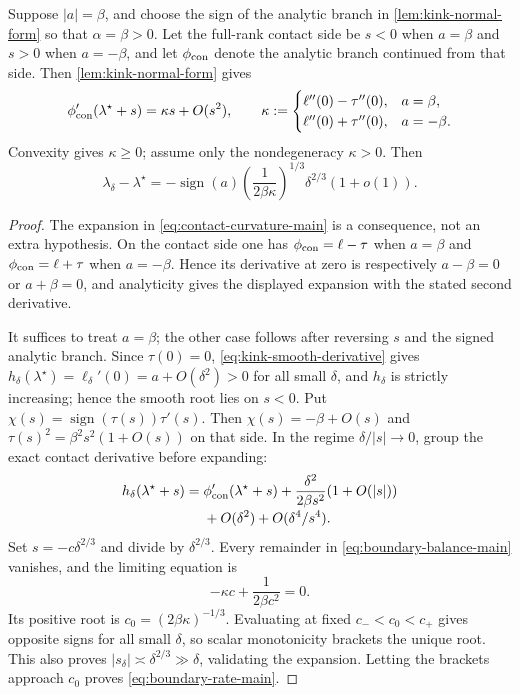 \begin{theorem}
\label{thm:rate-boundary}
Suppose \(|a|=\beta\), and choose the sign of the analytic branch in
\cref{lem:kink-normal-form} so that \(\alpha=\beta>0\).  Let the full-rank
contact side be \(s<0\) when \(a=\beta\) and \(s>0\) when \(a=-\beta\), and
let \(\phi_{\rm con}\) denote the analytic branch continued from that side.
Then \cref{lem:kink-normal-form} gives
\begin{equation}
 \phi'_{\rm con}(\lambda^\star+s)=\kappa s+O(s^2),
 \qquad
 \kappa:=
 \begin{cases}
  \ell''(0)-\tau''(0),&a=\beta,\\
  \ell''(0)+\tau''(0),&a=-\beta.
 \end{cases}
 \label{eq:contact-curvature-main}
\end{equation}
Convexity gives \(\kappa\ge0\); assume only the nondegeneracy
\(\kappa>0\).  Then
\begin{equation}
 \lambda_\delta-\lambda^\star
 =-\operatorname{sign}(a)
 \left(\frac{1}{2\beta\kappa}\right)^{1/3}
 \delta^{2/3}(1+o(1)).
 \label{eq:boundary-rate-main}
\end{equation}
\end{theorem}

\begin{proof}
The expansion in \eqref{eq:contact-curvature-main} is a consequence, not an
extra hypothesis.  On the contact side one has
\(\phi_{\rm con}=\ell-\tau\) when \(a=\beta\) and
\(\phi_{\rm con}=\ell+\tau\) when \(a=-\beta\).  Hence its derivative at
zero is respectively \(a-\beta=0\) or \(a+\beta=0\), and analyticity gives
the displayed expansion with the stated second derivative.

It suffices to treat \(a=\beta\); the other case follows after reversing
\(s\) and the signed analytic branch.  Since
\(\tau(0)=0\), \eqref{eq:kink-smooth-derivative} gives
\(h_\delta(\lambda^\star)=\ell_\delta'(0)=a+O(\delta^2)>0\) for all small
\(\delta\), and \(h_\delta\) is strictly increasing; hence the smooth root
lies on \(s<0\).
Put \(\chi(s)=\operatorname{sign}(\tau(s))\tau'(s)\).  Then
\(\chi(s)=-\beta+O(s)\) and
\(\tau(s)^2=\beta^2s^2(1+O(s))\) on that side.  In the regime
\(\delta/|s|\to0\), group the exact contact derivative before expanding:
\begin{align}
 h_\delta(\lambda^\star+s)
 ={}&\phi'_{\rm con}(\lambda^\star+s)
 +\frac{\delta^2}{2\beta s^2}(1+O(|s|)) \\[-0.2em]
 &+O(\delta^2)+O(\delta^4/s^4).
 \label{eq:boundary-balance-main}
\end{align}
Set \(s=-c\delta^{2/3}\) and divide by \(\delta^{2/3}\).  Every remainder
in \eqref{eq:boundary-balance-main} vanishes, and the limiting equation is
\[
 -\kappa c+\frac{1}{2\beta c^2}=0.
\]
Its positive root is \(c_0=(2\beta\kappa)^{-1/3}\).  Evaluating at fixed
\(c_-<c_0<c_+\) gives opposite signs for all small \(\delta\), so scalar
monotonicity brackets the unique root.  This also proves
\(|s_\delta|\asymp\delta^{2/3}\gg\delta\), validating the expansion.
Letting the brackets approach \(c_0\) proves \eqref{eq:boundary-rate-main}.
\end{proof}

